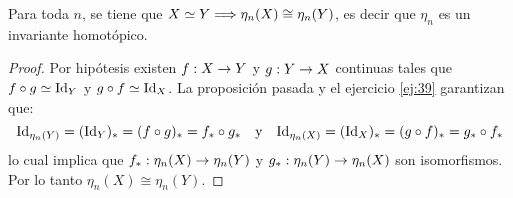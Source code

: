 \begin{ejercicio}\label{ej:40}
  Para toda $n$, se tiene que $X\simeq Y \Longrightarrow \eta_n(X)\cong\eta_n(Y)$, es decir que $\eta_n$ es
  un invariante homot\'opico.
\end{ejercicio}
\begin{proof}%
  Por hip\'otesis existen $f:X\rightarrow Y$ y $g:Y\rightarrow X$ continuas tales que $f\circ g\simeq \text{Id}_Y$ y
  $g\circ f\simeq\text{Id}_X$. La proposici\'on pasada y el ejercicio \ref{ej:39} garantizan que:
  \[
    \text{Id}_{\eta_n(Y)}=(\text{Id}_Y)_*=(f\circ g)_*=f_*\circ g_*  \quad\text{y}\quad
    \text{Id}_{\eta_n(X)}=(\text{Id}_X)_*=(g\circ f)_*=g_*\circ f_*
  \]
  lo cual implica que $f_*:\eta_n(X)\rightarrow\eta_n(Y)$ y $g_*:\eta_n(Y)\rightarrow\eta_n(X)$ son isomorfismos.
  Por lo tanto $\eta_n(X)\cong\eta_n(Y)$.
\end{proof}%

